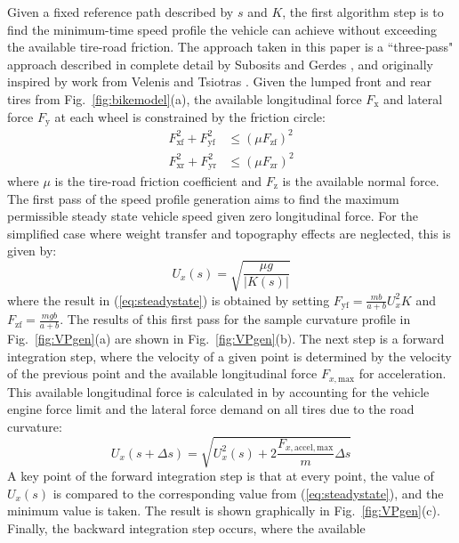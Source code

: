 \documentclass[twocolumn,10pt]{asme2ej}
\begin{document}
Given a fixed reference path described by $s$ and $K$, the first algorithm step is to find the minimum-time speed profile the vehicle can achieve
without exceeding the available tire-road friction. The approach taken in this paper is a ``three-pass" approach described in complete detail by 
Subosits and Gerdes \cite{subosits}, and originally inspired by work from Velenis and Tsiotras \cite{velenis}. 
Given the lumped front and rear tires from Fig.~\ref{fig:bikemodel}(a), the available longitudinal
force $F_\mathrm{x}$ and lateral force $F_\mathrm{y}$ at each wheel is constrained by the friction circle: 
\begin{subequations}
\label{eq:tireforce}
\begin{align}
	F^2_\mathrm{xf} + F_\mathrm{yf}^2 &\leq (\mu F_\mathrm{zf})^2\\
	F^2_\mathrm{xr} + F_\mathrm{yr}^2 &\leq (\mu F_\mathrm{zr})^2
\end{align}
\end{subequations}
where $\mu$ is the tire-road friction coefficient and $F_\mathrm{z}$ is the available normal force. The first pass of the speed profile generation aims to find the maximum permissible steady 
state vehicle speed given zero longitudinal force. For the simplified case where weight transfer and topography effects are neglected, this is given by:
\begin{equation}
\label{eq:steadystate}
	U_x(s) = \sqrt{\frac{\mu g}{|K(s)|}}
\end{equation}
where the result in (\ref{eq:steadystate}) is  obtained by setting $F_\mathrm{yf} = \frac{mb}{a+b}U_x^2K$ and $F_\mathrm{zf} = \frac{mgb}{a+b}$.
 The results of this first pass for the sample curvature profile in Fig.~\ref{fig:VPgen}(a) are shown in Fig.~\ref{fig:VPgen}(b).
 The next step is a forward 
integration step, where the velocity of a given point is determined by the velocity of the previous point and the available longitudinal force $F_{x,\mathrm{max}}$ for acceleration.
This available longitudinal force is calculated in \cite{subosits} by accounting for the vehicle engine force limit and the lateral force demand on all tires due to the road curvature:
\begin{equation}
\label{eq:forwardint}
	U_x(s+\Delta s) =\sqrt{U^2_x(s)+\mathrm{2}\frac{F_{x,\mathrm{accel,max}}}{m}\Delta s}
\end{equation}
A key point of the forward integration step is that at every point, the value of $U_x(s)$ is compared to the corresponding value from (\ref{eq:steadystate}), and
the minimum value is taken. The result is shown graphically in Fig.~\ref{fig:VPgen}(c). Finally, the backward integration step occurs, where the available
\end{document}

